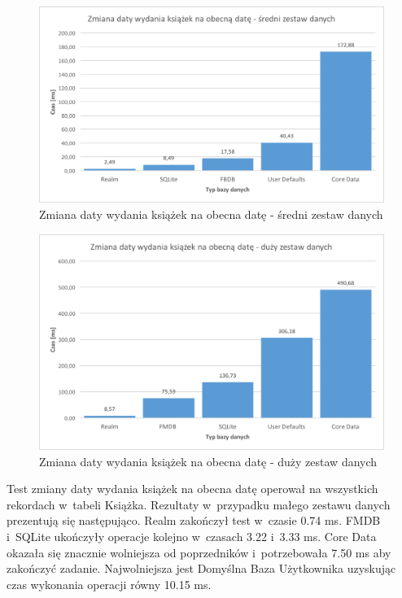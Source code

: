 \begin{figure}[H]
    \centering\includegraphics[width=\linewidth]{img/update_data/update_book/update_book_medium_test.png}
    \caption{Zmiana daty wydania książek na obecna datę - średni zestaw danych}
    \label{img: update-by-book-medium}
\end{figure}

\begin{figure}[H]
    \centering\includegraphics[width=\linewidth]{img/update_data/update_book/update_book_big_test.png}
    \caption{Zmiana daty wydania książek na obecna datę - duży zestaw danych}
    \label{img: update-by-book-big}
\end{figure}

Test zmiany daty wydania książek na obecna datę operował na wszystkich rekordach w~tabeli Książka. Rezultaty w~przypadku małego zestawu danych prezentują się następująco. Realm zakończył test w~czasie 0.74 ms. FMDB i~SQLite ukończyły operacje kolejno w~czasach 3.22 i~3.33 ms. Core Data okazała się znacznie wolniejsza od poprzedników i~potrzebowała 7.50 ms aby zakończyć zadanie. Najwolniejsza jest Domyślna Baza Użytkownika uzyskując czas wykonania operacji równy 10.15 ms. 

